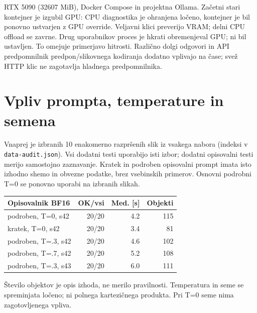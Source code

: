 \documentclass[10pt,a4paper]{article}
\begin{document}
RTX 5090 (32607 MiB), Docker Compose in projektna Ollama. Začetni stari kontejner je izgubil GPU: CPU diagnostika je ohranjena ločeno, kontejner je bil ponovno ustvarjen z GPU override. Veljavni klici preverijo VRAM; delni CPU offload se zavrne. Drug uporabnikov proces je hkrati obremenjeval GPU; ni bil ustavljen. To omejuje primerjavo hitrosti. Različno dolgi odgovori in API predpomnilnik predpon/slikovnega kodiranja dodatno vplivajo na čase; svež HTTP klic ne zagotavlja hladnega predpomnilnika.

\newpage
\section*{Vpliv prompta, temperature in semena}
Vnaprej je izbranih 10 enakomerno razpršenih slik iz vsakega nabora (indeksi v \texttt{data-audit.json}). Vsi dodatni testi uporabijo isti izbor; dodatni opisovalni testi merijo samostojno zaznavanje. Kratek in podroben opisovalni prompt imata isto izhodno shemo in obvezne podatke, brez vsebinskih primerov. Osnovni podrobni T=0 se ponovno uporabi na izbranih slikah.
\begin{center}\small\begin{tabular}{lrrr}\toprule
Opisovalnik BF16 & OK/vsi & Med. [s] & Objekti \\ \midrule
podroben, T=0, s42 & 20/20 & 4.2 & 115 \\
kratek, T=0, s42 & 20/20 & 3.4 & 81 \\
podroben, T=.3, s42 & 20/20 & 4.6 & 102 \\
podroben, T=.7, s42 & 20/20 & 5.2 & 108 \\
podroben, T=.3, s43 & 20/20 & 6.0 & 111 \\
\bottomrule\end{tabular}\end{center}

Število objektov je opis izhoda, ne merilo pravilnosti. Temperatura in seme se spreminjata ločeno; ni polnega kartezičnega produkta. Pri T=0 seme nima zagotovljenega vpliva.
\end{document}
